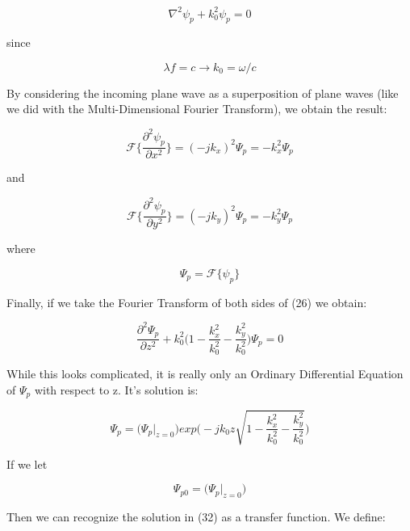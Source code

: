 \documentclass[12pt]{article}
\begin{document}
\begin{equation}
	\nabla^2\psi_{p} + k_{0}^2\psi_{p} = 0
\end{equation}

since

\begin{equation}
	\lambda f = c \rightarrow k_{0} = \omega/c
\end{equation}

By considering the incoming plane wave as a superposition of plane waves (like we did with the Multi-Dimensional Fourier Transform), we obtain the result:

\begin{equation}
	\mathscr{F} \Big\{ \frac{\partial^2 \psi_{p}}{\partial x^2} \Big\} = (-jk_{x})^2\Psi_{p} = -k_{x}^2\Psi_{p}
\end{equation}

and

\begin{equation}
	\mathscr{F} \Big\{ \frac{\partial^2 \psi_{p}}{\partial y^2} \Big\} = (-jk_{y})^2\Psi_{p} = -k_{y}^2\Psi_{p}
\end{equation}

where 

\begin{equation}
	\Psi_{p} = \mathscr{F} \{\psi_{p}\}
\end{equation}

Finally, if we take the Fourier Transform of both sides of (26) we obtain:

\begin{equation}
	\frac{\partial^2\Psi_{p}}{\partial z^2} + k_{0}^{2} \bigg ( 1 - \frac{k_{x}^2}{k_{0}^2} - \frac{k_{y}^2}{k_{0}^2} \bigg ) \Psi_{p} = 0
\end{equation}

While this looks complicated, it is really only an Ordinary Differential Equation of \(\Psi_{p}\) with respect to z. It's solution is:

\begin{equation}
	\Psi_{p} = \big(\Psi_{p}\vert_{z = 0}\big) exp\Bigg(-jk_{0}z\sqrt{1 - \frac{k_{x}^2}{k_{0}^2} - \frac{k_{y}^2}{k_{0}^2}}\Bigg)
\end{equation}

If we let

\begin{equation}
	\Psi_{p0} = \big(\Psi_{p}\vert_{z = 0}\big)
\end{equation}

Then we can recognize the solution in (32) as a transfer function. We define:
\end{document}
